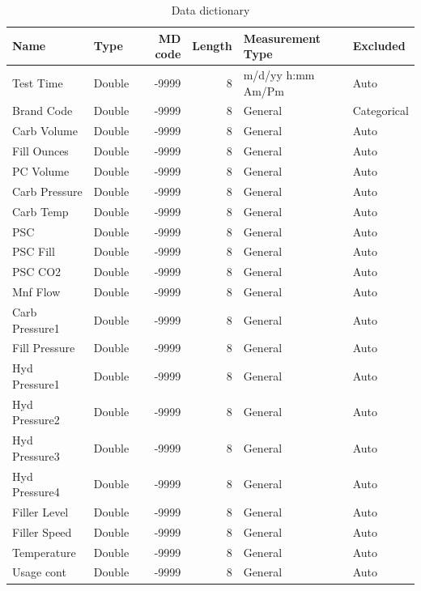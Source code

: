 \documentclass[]{report}
\begin{document}
\begin{table}[H]

\caption{\label{tab:project2a1}Data dictionary}
\centering
\begin{tabular}[t]{llrrll}
\toprule
\textbf{Name} & \textbf{Type} & \textbf{MD code} & \textbf{Length} & \textbf{Measurement Type} & \textbf{Excluded}\\
\midrule
\rowcolor{gray!6}  Test Time & Double & -9999 & 8 & m/d/yy h:mm Am/Pm & Auto\\
Brand Code & Double & -9999 & 8 & General & Categorical\\
\rowcolor{gray!6}  Carb Volume & Double & -9999 & 8 & General & Auto\\
Fill Ounces & Double & -9999 & 8 & General & Auto\\
\rowcolor{gray!6}  PC Volume & Double & -9999 & 8 & General & Auto\\
\addlinespace
Carb Pressure & Double & -9999 & 8 & General & Auto\\
\rowcolor{gray!6}  Carb Temp & Double & -9999 & 8 & General & Auto\\
PSC & Double & -9999 & 8 & General & Auto\\
\rowcolor{gray!6}  PSC Fill & Double & -9999 & 8 & General & Auto\\
PSC CO2 & Double & -9999 & 8 & General & Auto\\
\addlinespace
\rowcolor{gray!6}  Mnf Flow & Double & -9999 & 8 & General & Auto\\
Carb Pressure1 & Double & -9999 & 8 & General & Auto\\
\rowcolor{gray!6}  Fill Pressure & Double & -9999 & 8 & General & Auto\\
Hyd Pressure1 & Double & -9999 & 8 & General & Auto\\
\rowcolor{gray!6}  Hyd Pressure2 & Double & -9999 & 8 & General & Auto\\
\addlinespace
Hyd Pressure3 & Double & -9999 & 8 & General & Auto\\
\rowcolor{gray!6}  Hyd Pressure4 & Double & -9999 & 8 & General & Auto\\
Filler Level & Double & -9999 & 8 & General & Auto\\
\rowcolor{gray!6}  Filler Speed & Double & -9999 & 8 & General & Auto\\
Temperature & Double & -9999 & 8 & General & Auto\\
\addlinespace
\rowcolor{gray!6}  Usage cont & Double & -9999 & 8 & General & Auto\\

\end{tabular}
\end{table}
\end{document}
